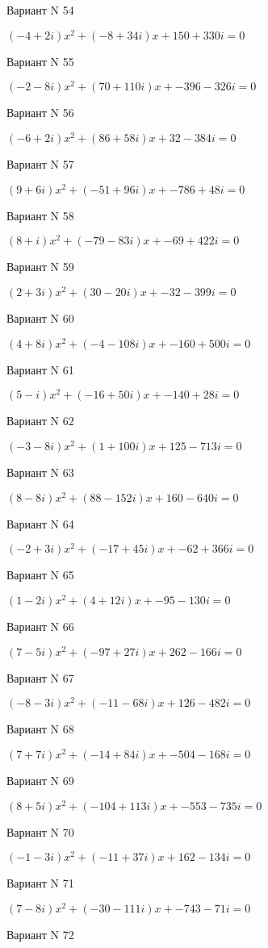 \documentclass[11pt]{report}
\begin{document}
Вариант N 54

$(-4 + 2 i)x^2 + (-8 + 34 i)x + 150 + 330 i = 0$

Вариант N 55

$(-2 - 8 i)x^2 + (70 + 110 i)x + -396 - 326 i = 0$

Вариант N 56

$(-6 + 2 i)x^2 + (86 + 58 i)x + 32 - 384 i = 0$

Вариант N 57

$(9 + 6 i)x^2 + (-51 + 96 i)x + -786 + 48 i = 0$

Вариант N 58

$(8 + i)x^2 + (-79 - 83 i)x + -69 + 422 i = 0$

Вариант N 59

$(2 + 3 i)x^2 + (30 - 20 i)x + -32 - 399 i = 0$

Вариант N 60

$(4 + 8 i)x^2 + (-4 - 108 i)x + -160 + 500 i = 0$

Вариант N 61

$(5 - i)x^2 + (-16 + 50 i)x + -140 + 28 i = 0$

Вариант N 62

$(-3 - 8 i)x^2 + (1 + 100 i)x + 125 - 713 i = 0$

Вариант N 63

$(8 - 8 i)x^2 + (88 - 152 i)x + 160 - 640 i = 0$

Вариант N 64

$(-2 + 3 i)x^2 + (-17 + 45 i)x + -62 + 366 i = 0$

Вариант N 65

$(1 - 2 i)x^2 + (4 + 12 i)x + -95 - 130 i = 0$

Вариант N 66

$(7 - 5 i)x^2 + (-97 + 27 i)x + 262 - 166 i = 0$

Вариант N 67

$(-8 - 3 i)x^2 + (-11 - 68 i)x + 126 - 482 i = 0$

Вариант N 68

$(7 + 7 i)x^2 + (-14 + 84 i)x + -504 - 168 i = 0$

Вариант N 69

$(8 + 5 i)x^2 + (-104 + 113 i)x + -553 - 735 i = 0$

Вариант N 70

$(-1 - 3 i)x^2 + (-11 + 37 i)x + 162 - 134 i = 0$

Вариант N 71

$(7 - 8 i)x^2 + (-30 - 111 i)x + -743 - 71 i = 0$

Вариант N 72
\end{document}
